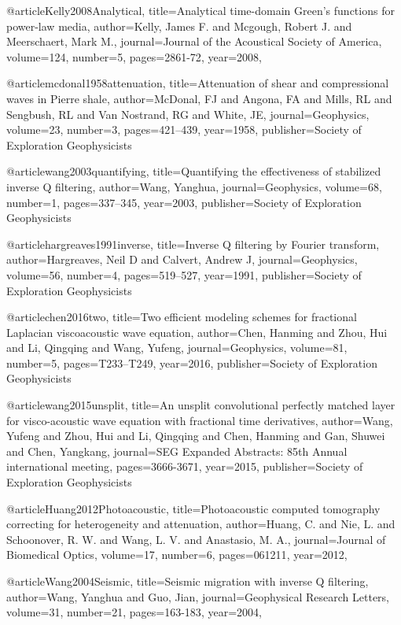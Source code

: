@article{Kelly2008Analytical,
  title={Analytical time-domain Green's functions for power-law media},
  author={Kelly, James F. and Mcgough, Robert J. and Meerschaert, Mark M.},
  journal={Journal of the Acoustical Society of America},
  volume={124},
  number={5},
  pages={2861-72},
  year={2008},
}

@article{mcdonal1958attenuation,
  title={Attenuation of shear and compressional waves in Pierre shale},
  author={McDonal, FJ and Angona, FA and Mills, RL and Sengbush, RL and Van Nostrand, RG and White, JE},
  journal={Geophysics},
  volume={23},
  number={3},
  pages={421--439},
  year={1958},
  publisher={Society of Exploration Geophysicists}
}

@article{wang2003quantifying,
  title={Quantifying the effectiveness of stabilized inverse {Q} filtering},
  author={Wang, Yanghua},
  journal={Geophysics},
  volume={68},
  number={1},
  pages={337--345},
  year={2003},
  publisher={Society of Exploration Geophysicists}
}

@article{hargreaves1991inverse,
  title={Inverse {Q} filtering by {F}ourier transform},
  author={Hargreaves, Neil D and Calvert, Andrew J},
  journal={Geophysics},
  volume={56},
  number={4},
  pages={519--527},
  year={1991},
  publisher={Society of Exploration Geophysicists}
}

@article{chen2016two,
  title={Two efficient modeling schemes for fractional {L}aplacian viscoacoustic wave equation},
  author={Chen, Hanming and Zhou, Hui and Li, Qingqing and Wang, Yufeng},
  journal={Geophysics},
  volume={81},
  number={5},
  pages={T233--T249},
  year={2016},
  publisher={Society of Exploration Geophysicists}
}

@article{wang2015unsplit,
  title={An unsplit convolutional perfectly matched layer for visco-acoustic wave equation with fractional time derivatives},
  author={Wang, Yufeng and Zhou, Hui and Li, Qingqing and Chen, Hanming and Gan, Shuwei and Chen, Yangkang},
  journal={SEG Expanded Abstracts: 85th Annual international meeting},
  pages={3666-3671},
  year={2015},
  publisher={Society of Exploration Geophysicists}
}

@article{Huang2012Photoacoustic,
  title={Photoacoustic computed tomography correcting for heterogeneity and attenuation},
  author={Huang, C. and Nie, L. and Schoonover, R. W. and Wang, L. V. and Anastasio, M. A.},
  journal={Journal of Biomedical Optics},
  volume={17},
  number={6},
  pages={061211},
  year={2012},
}

@article{Wang2004Seismic,
  title={Seismic migration with inverse {Q} filtering},
  author={Wang, Yanghua and Guo, Jian},
  journal={Geophysical Research Letters},
  volume={31},
  number={21},
  pages={163-183},
  year={2004},
}

